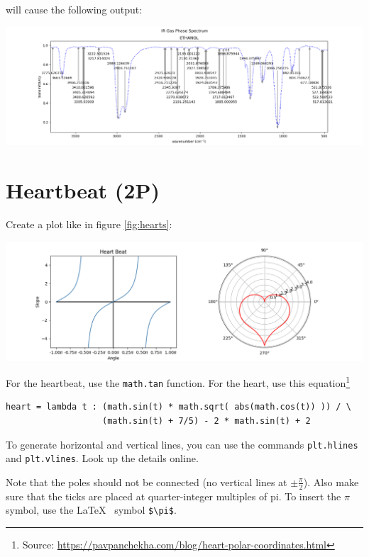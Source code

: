 \documentclass[
	english,
	fontsize=10pt,
	parskip=half,
	titlepage=true,
	DIV=12
]{scrartcl}
\begin{document}
will cause the following output:

\begin{minipage}{\linewidth}
\includegraphics[width=\linewidth]{./task1-endresult-ethanol}
\end{minipage}


\section{Heartbeat (2\;P)}
Create a plot like in figure \ref{fig:hearts}:\\
\begin{minipage}{\linewidth}
\includegraphics[width=\linewidth]{./task2}
\label{fig:hearts}
\end{minipage}

For the heartbeat, use the \texttt{math.tan} function. For the heart, use this equation\footnote{Source: \url{https://pavpanchekha.com/blog/heart-polar-coordinates.html}}
\begin{verbatim}
heart = lambda t : (math.sin(t) * math.sqrt( abs(math.cos(t)) )) / \
                   (math.sin(t) + 7/5) - 2 * math.sin(t) + 2
\end{verbatim}

To generate horizontal and vertical lines, you can use the commands \texttt{plt.hlines} and \texttt{plt.vlines}. Look up the details online.

Note that the poles should not be connected (no vertical lines at $\pm \frac{\pi}{2}$). Also make sure that the ticks are placed at quarter-integer multiples of pi. To insert the $\pi$ symbol, use the \LaTeX~ symbol \texttt{\$\textbackslash pi\$}.
\end{document}
